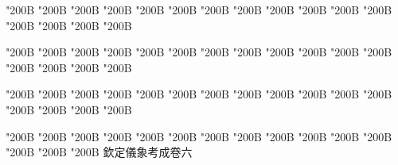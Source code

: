\begin{正文}
\char"200B\relax{}
\char"200B\relax{}
\char"200B\relax{}
\char"200B\relax{}
\char"200B\relax{}
\char"200B\relax{}
\char"200B\relax{}
\char"200B\relax{}
\char"200B\relax{}
\char"200B\relax{}
\char"200B\relax{}
\char"200B\relax{}
\char"200B\relax{}
\char"200B\relax{}
\char"200B\relax{}
\char"200B\relax
{}\par
\end{正文}\clearpage
{}
\begin{正文}
\char"200B\relax{}
\char"200B\relax{}
\char"200B\relax{}
\char"200B\relax{}
\char"200B\relax{}
\char"200B\relax{}
\char"200B\relax{}
\char"200B\relax{}
\char"200B\relax{}
\char"200B\relax{}
\char"200B\relax{}
\char"200B\relax{}
\char"200B\relax{}
\char"200B\relax{}
\char"200B\relax{}
\char"200B\relax
{}\par
\end{正文}\clearpage
{}
\begin{正文}
\char"200B\relax{}
\char"200B\relax{}
\char"200B\relax{}
\char"200B\relax{}
\char"200B\relax{}
\char"200B\relax{}
\char"200B\relax{}
\char"200B\relax{}
\char"200B\relax{}
\char"200B\relax{}
\char"200B\relax{}
\char"200B\relax{}
\char"200B\relax{}
\char"200B\relax{}
\char"200B\relax{}
\char"200B\relax
{}\par
\end{正文}\clearpage
{}
\begin{正文}
\char"200B\relax{}
\char"200B\relax{}
\char"200B\relax{}
\char"200B\relax{}
\char"200B\relax{}
\char"200B\relax{}
\char"200B\relax{}
\char"200B\relax{}
\char"200B\relax{}
\char"200B\relax{}
\char"200B\relax{}
\char"200B\relax{}
\char"200B\relax{}
\char"200B\relax{}
\char"200B\relax{}
欽定儀象考成卷六
\par

\par\end{正文}\clearpage
